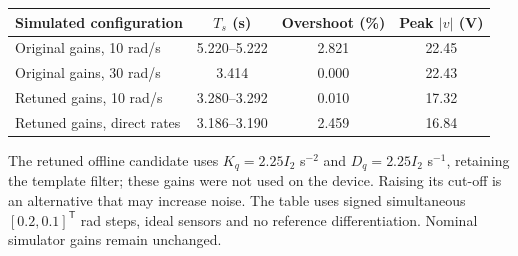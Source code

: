 \begin{center}
\begin{tabular}{lccc}
\hline
Simulated configuration & $T_s$ (s) & Overshoot (\%) & Peak $|v|$ (V)\\\hline
Original gains, 10 rad/s & 5.220--5.222 & 2.821 & 22.45\\
Original gains, 30 rad/s & 3.414 & 0.000 & 22.43\\
Retuned gains, 10 rad/s & 3.280--3.292 & 0.010 & 17.32\\
Retuned gains, direct rates & 3.186--3.190 & 2.459 & 16.84\\
\hline
\end{tabular}
\end{center}
The retuned offline candidate uses $K_q=2.25I_2$ s$^{-2}$ and $D_q=2.25I_2$ s$^{-1}$, retaining the template filter; these gains were not used on the device. Raising its cut-off is an alternative that may increase noise. The table uses signed simultaneous $[0.2,0.1]^\mathsf{T}$ rad steps, ideal sensors and no reference differentiation. Nominal simulator gains remain unchanged.
